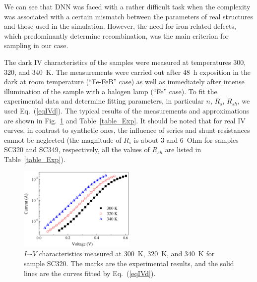 \documentclass[num-refs]{wiley-article} %
\begin{document}
We can see that DNN was faced with a rather difficult task
when the complexity was associated with a certain mismatch between the parameters of real structures and those used in the simulation.
However, the need for iron-related defects, which predominantly determine recombination, was the main criterion for sampling in our case.


The dark IV characteristics of the samples were measured at temperatures
300, 320, and 340~K.
The measurements were carried out after 48~h exposition in the dark at room temperature
(``Fe-FeB'' case)
as well as immediately after intense illumination of the sample with a halogen lamp
(``Fe'' case).
To fit the experimental data and determine fitting parameters, in particular $n$, $R_s$, $R_{sh}$,
we used Eq.~(\ref{eqIVd}).
The typical results of the measurements and approximations are shown in Fig.~\ref{fig_IVexp}
and Table~\ref{table_Exp}.
It should be noted that for real IV curves, in contrast to synthetic ones,
the influence of series and shunt resistances cannot be neglected
(the magnitude of $R_s$ is about 3 and 6~Ohm for samples SC320 and SC349, respectively,
all the values of $R_{sh}$ are listed in Table~\ref{table_Exp}).

\begin{figure}[t]
\centering
\includegraphics[width=0.5\textwidth]{Fig9}
\caption{
$I$–-$V$ characteristics measured at 300~K, 320~K, and 340~K for
sample SC320.
The marks are the experimental results, and
the solid lines are the curves fitted by
Eq.~(\ref{eqIVd}).
}
\label{fig_IVexp}
\end{figure}
\end{document}
